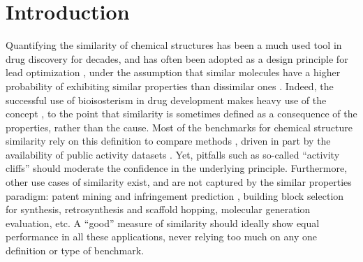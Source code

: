 \documentclass[doublespacing]{bmcart}
\begin{document}
\section*{Introduction}
Quantifying the similarity of chemical structures has been a much used tool in drug discovery for decades\cite{willett1998chemical}, and has often been adopted as a design principle for lead optimization \cite{kubinyi1998similarity, maggiora2014molecular}, under the assumption that similar molecules have a higher probability of exhibiting similar properties than dissimilar ones \cite{johnson1990concepts, patterson1996neighborhood, martin2002structurally}. Indeed, the successful use of bioisosterism in drug development makes heavy use of the concept  \cite{patani1996bioisosterism, lima2005bioisosterism}, to the point that similarity is sometimes defined as a consequence of the properties, rather than the cause\cite{bender2004molecular}. Most of the benchmarks for chemical structure similarity rely on this definition to compare methods \cite{irwin2008community, rohrer2009maximum, riniker2013open}, driven in part by the availability of public activity datasets \cite{gaulton2012chembl}. Yet, pitfalls such as so-called ``activity cliffs''\cite{maggiora2006outliers, stumpfe2012exploring, stumpfe2014recent} should moderate the confidence in the underlying principle. Furthermore, other use cases of similarity exist, and are not captured by the similar properties paradigm: patent mining and infringement prediction \cite{rhodes2007mining}, building block selection for synthesis, retrosynthesis and scaffold hopping\cite{bohm2004scaffold, boehm2008similarity, coley2017computer}, molecular generation evaluation\cite{mendez2020novo}, etc. A ``good'' measure of similarity should ideally show equal performance in all these applications, never relying too much on any one definition or type of benchmark.
\end{document}
